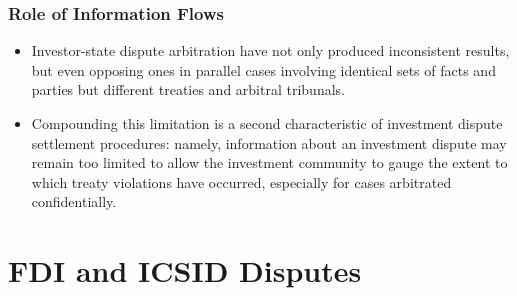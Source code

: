 \documentclass[10pt]{beamer}
\begin{document}
\begin{frame}
\frametitle{Role of Information Flows}

\begin{itemize}
	\item Investor-state dispute arbitration have not only produced inconsistent results, but even opposing ones in parallel cases involving identical sets of facts and parties but different treaties and arbitral tribunals. 
	\item Compounding this limitation is a second characteristic of investment dispute settlement procedures: namely, information about an investment dispute may remain too limited to allow the investment community to gauge the extent to which treaty violations have occurred, especially for cases arbitrated confidentially. 
\end{itemize}

\end{frame}

\section{FDI and ICSID Disputes}
\end{document}
